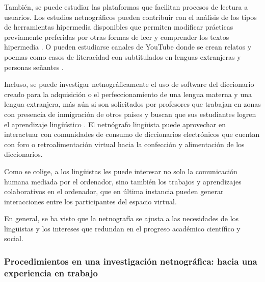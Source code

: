 También, se puede estudiar las plataformas que facilitan procesos de
lectura a usuarios. Los estudios netnográficos pueden contribuir con el
análisis de los tipos de herramientas hipermedia disponibles que
permiten modificar prácticas previamente preferidas por otras formas de
leer y comprender los textos hipermedia \cite{azman2017hypermedia}. O
pueden estudiarse canales de YouTube donde se crean relatos y poemas
como casos de literacidad con subtitulados en lenguas extranjeras y
personas señantes \cite{broullón-lonzano2019}.

Incluso, se puede investigar netnográficamente el uso de software del
diccionario creado para la adquisición o el perfeccionamiento de una
lengua materna y una lengua extranjera, más aún si son solicitados por
profesores que trabajan en zonas con presencia de inmigración de otros
países y buscan que sus estudiantes logren el aprendizaje lingüístico
\cite{turrini2000}. El netnógrafo lingüista puede aprovechar
en interactuar con comunidades de consumo de diccionarios electrónicos
que cuentan con foro o retroalimentación virtual hacia la confección y
alimentación de los diccionarios.

Como se colige, a los lingüistas les puede interesar no solo la
comunicación humana mediada por el ordenador, sino también los trabajos
y aprendizajes colaborativos en el ordenador, que en última instancia
pueden generar interacciones entre los participantes del espacio
virtual.

En general, se ha visto que la netnografía se ajusta a las necesidades
de los lingüistas y los intereses que redundan en el progreso académico
científico y social.

\subsubsection{Procedimientos en una investigación netnográfica: hacia una
experiencia en trabajo}

